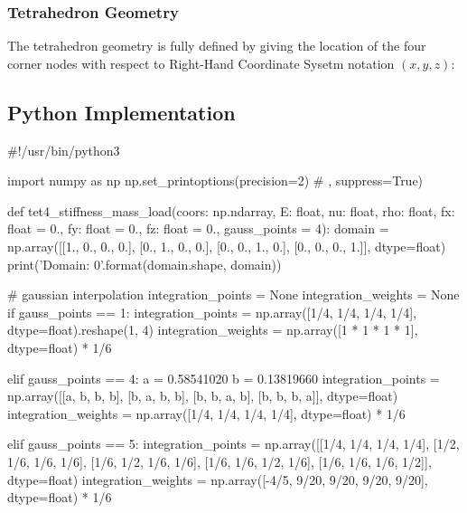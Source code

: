 \subsubsection{Tetrahedron Geometry}

The tetrahedron geometry is fully defined by giving the location of the four
corner nodes with respect to Right-Hand Coordinate Sysetm notation $ (x, y, z) $:




\subsection{Python Implementation}
\begin{python}
#!/usr/bin/python3

import numpy as np
np.set_printoptions(precision=2) # , suppress=True)

def tet4_stiffness_mass_load(coors: np.ndarray,
                             E: float,
                             nu: float,
                             rho: float,
                             fx: float = 0.,
                             fy: float = 0.,
                             fz: float = 0.,
                             gauss_points = 4):
    domain = np.array([[1., 0., 0., 0.],
                       [0., 1., 0., 0.],
                       [0., 0., 1., 0.],
                       [0., 0., 0., 1.]], dtype=float)
    print('Domain: {0}'.format(domain.shape, domain))

    # gaussian interpolation
    integration_points = None
    integration_weights = None
    if gauss_points == 1:
        integration_points = np.array([1/4, 1/4, 1/4, 1/4],
                                      dtype=float).reshape(1, 4)
        integration_weights = np.array([1 * 1 * 1 * 1],
                                       dtype=float) * 1/6

    elif gauss_points == 4:
        a = 0.58541020
        b = 0.13819660
        integration_points = np.array([[a, b, b, b],
                                       [b, a, b, b],
                                       [b, b, a, b],
                                       [b, b, b, a]], dtype=float)
        integration_weights = np.array([1/4, 1/4, 1/4, 1/4],
                                       dtype=float) * 1/6

    elif gauss_points == 5:
        integration_points = np.array([[1/4, 1/4, 1/4, 1/4],
                                       [1/2, 1/6, 1/6, 1/6],
                                       [1/6, 1/2, 1/6, 1/6],
                                       [1/6, 1/6, 1/2, 1/6],
                                       [1/6, 1/6, 1/6, 1/2]], dtype=float)
        integration_weights = np.array([-4/5, 9/20, 9/20, 9/20, 9/20],
                                       dtype=float) * 1/6


\end{python}
